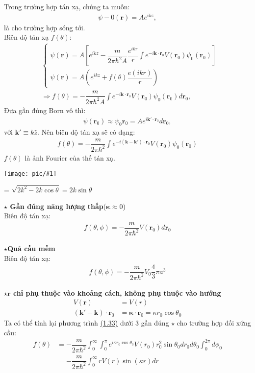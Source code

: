 \documentclass{report}
\newcommand{\image}[1]{
	\begin{center}
		\texttt{[image: pic/\#1]}
	\end{center}
}
\newcommand{\dps}{\displaystyle}
\newcommand{\f}[2]{\dfrac{#1}{#2}}
\begin{document}
		Trong trường hợp tán xạ, chúng ta muốn:
		\begin{align}
			\psi-0(\mathbf{r}) = A e^{ikz},
		\end{align}
		là cho trường hợp sóng tới.\\
		Biên độ tán xạ $f(\theta)$:
\begin{align}
	&
	\begin{cases*}
		\psi(\mathbf{r})  = A \left[ e^{ikz} - \f{m}{2\pi \hbar^2 A} \f{e^{ikr}}{r} \dps\int e^{-i \mathbf{k\cdot}\mathbf{r}_0} V(\mathbf{r}_0) \psi_0(\mathbf{r}_0)    \right] \\
		\psi(\mathbf{r})  = A\left(e^{ikz} + f(\theta) \f{e(ikr)}{r}\right)
	\end{cases*}\nonumber\\
	&\Rightarrow f(\theta)  = -\f{m}{2\pi \hbar^2A} \int e^{-i \mathbf{k\cdot}\mathbf{r}_0} V(\mathbf{r}_0) \psi_0(\mathbf{r}_0) d\mathbf{r}_0,
\end{align}
Đưa gần đúng Born vô thì:
\begin{align}
	\psi(\mathbf{r}_0) \approx \psi_0 \mathbf{r}_0 = A e^{i\mathbf{k'}\cdot \mathbf{r}_0}d\mathbf{r}_0,
\end{align}
với $\mathbf{k'} \equiv k \hat{z} $. Nên biên độ tán xạ sẽ có dạng:
\begin{align}
	f(\theta) = -\f{m}{2\pi \hbar^2 } \int e^{-i (\mathbf{k} - \mathbf{k'}) \cdot \mathbf{r}_0} V(\mathbf{r}_0) \psi_0(\mathbf{r}_0)
\end{align}\label{eq1.33}
$f(\theta)$ là ảnh Fourier của thế tán xạ.
\image{wave_vector_born.png}

\boldsymbol{$\kappa$} = $\sqrt{2k^2 - 2k\cos \theta} = 2k\sin\theta$

\textbf{$\star$ Gần đúng năng lượng thấp}($\boldsymbol{\kappa} \approx 0$)\\
Biên độ tán xạ:
\begin{align}
	f(\theta,\phi) = -\f{m}{2\pi \hbar^2} V(\mathbf{r}_0) d\mathbf{r}_0
\end{align}

\textbf{$\star$Quả cầu mềm}\\
Biên độ tán xạ:
\begin{align}
	f(\theta,\phi) = -\f{m}{2\pi \hbar^2 } V_0 \f{4}{3}\pi a^3
\end{align}

\textbf{$\star$$\mathbf{r}$ chỉ phụ thuộc vào khoảng cách, không phụ thuộc vào hướng}
\begin{align*}
	V(\mathbf{r}) &= V(r) \\ 
	\left(\mathbf{k'} - \mathbf{k} \right) \cdot \mathbf{r}_0  &= \boldsymbol{\kappa} \cdot \mathbf{r}_0 = \kappa r_0 \cos \theta_0
\end{align*}
Ta có thể tính lại phương trình \hyperref[eq1.33]{(1.33)} dưới 3 gần đúng  $\star$ cho trường hợp đối xứng cầu:
\begin{align}
	f(\theta) &= -\f{m}{2\pi \hbar^2 } \int_0^\infty \int_0^\pi e^{ i\kappa r_0 \cos\theta_0 } V(r_0) r_0^2 \sin\theta_0 dr_0 d\theta_0 \int_0^{2\pi} d\phi_0\\
	&= -\f{m}{2\pi \hbar^2 } \int_{0}^{\infty} rV(r) \sin(\kappa r) dr
\end{align}
\end{document}
